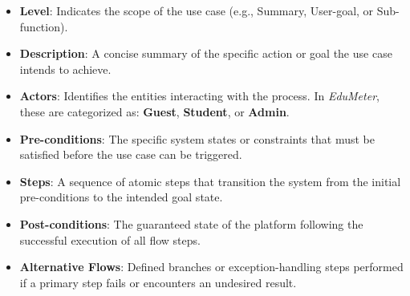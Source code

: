\begin{itemize}
	\item{\textbf{Level}}: Indicates the scope of the use case (e.g., Summary, User-goal, or Sub-function). 
	\item{\textbf{Description}}: A concise summary of the specific action or goal the use case intends to achieve.
	\item{\textbf{Actors}}: Identifies the entities interacting with the process. In \textit{EduMeter}, these are categorized as: \textbf{Guest}, \textbf{Student}, or \textbf{Admin}.
	\item{\textbf{Pre-conditions}}: The specific system states or constraints that must be satisfied before the use case can be triggered.
	\item{\textbf{Steps}}: A sequence of atomic steps that transition the system from the initial pre-conditions to the intended goal state.
	\item{\textbf{Post-conditions}}: The guaranteed state of the platform following the successful execution of all flow steps.
	\item{\textbf{Alternative Flows}}: Defined branches or exception-handling steps performed if a primary step fails or encounters an undesired result.
\end{itemize} 

